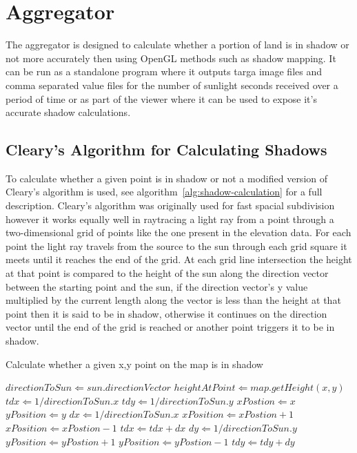 \documentclass[12pt]{report}
\begin{document}
\chapter{Aggregator}

The aggregator is designed to calculate whether a portion of land is in shadow or not more accurately then using OpenGL methods such as shadow mapping. It can be run as a standalone program where it outputs targa image files and comma separated value files for the number of sunlight seconds received over a period of time or as part of the viewer where it can be used to expose it's accurate shadow calculations.

\section{Cleary's Algorithm for Calculating Shadows}
To calculate whether a given point is in shadow or not a modified version of Cleary's algorithm is used, see algorithm~\ref{alg:shadow-calculation} for a full description. Cleary's algorithm was originally used for fast spacial subdivision however it works equally well in raytracing a light ray from a point through a two-dimensional grid of points like the one present in the elevation data. For each point the light ray travels from the source to the sun through each grid square it meets until it reaches the end of the grid. At each grid line intersection the height at that point is compared to the height of the sun along the direction vector between the starting point and the sun, if the direction vector's y value multiplied by the current length along the vector is less than the height at that point then it is said to be in shadow, otherwise it continues on the direction vector until the end of the grid is reached or another point triggers it to be in shadow.

\begin{algorithm}[h]
\caption{Calculate whether a given x,y point on the map is in shadow}
\label{alg:shadow-calculation}%
\begin{algorithmic}           %
\STATE $directionToSun \Leftarrow sun.directionVector$
\STATE $heightAtPoint \Leftarrow map.getHeight(x,y)$
\STATE $tdx \Leftarrow 1 / directionToSun.x$
\STATE $tdy \Leftarrow 1 / directionToSun.y$
\STATE $xPostion \Leftarrow x$
\STATE $yPosition \Leftarrow y$
	\ENDIF
		\STATE $dx \Leftarrow 1 / directionToSun.x$
			\STATE $xPosition \Leftarrow xPostion + 1$	
		\ELSE
			\STATE $xPosition \Leftarrow xPostion - 1$	
		\ENDIF
		\STATE $tdx \Leftarrow tdx + dx$
	\ELSE
		\STATE $dy \Leftarrow 1 / directionToSun.y$
			\STATE $yPosition \Leftarrow yPostion + 1$	
		\ELSE
			\STATE $yPosition \Leftarrow yPostion - 1$	
		\ENDIF
		\STATE $tdy \Leftarrow tdy + dy$		
	\ENDIF
\ENDWHILE
{}
\end{algorithmic}
\end{algorithm}
\end{document}
